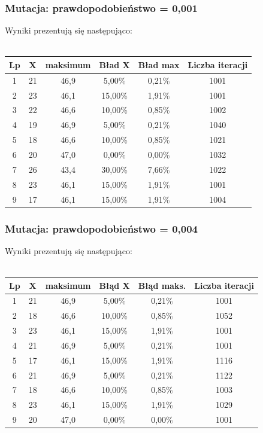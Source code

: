 \documentclass[a4paper,11pt]{article}
\begin{document}
				\subsubsection{Mutacja: prawdopodobieństwo = 0,001}
					Wyniki prezentują się następująco:\\~\\
					\begin{tabular}{|c|c|c|c|c|c|}
						\hline 
						Lp & X & maksimum & Bład X & Bład max & Liczba iteracji\\\hline
						1 & 21 & 46,9 & 5,00\% &0,21\%  &1001\\\hline
						2 & 23 & 46,1 & 15,00\% & 1,91\% &1001 \\\hline
						3 & 22 & 46,6 & 10,00\% &0,85\% &1002 \\\hline
						4 & 19 & 46,9 & 5,00\% & 0,21\%&1040 \\\hline
						5 & 18 & 46,6 & 10,00\% & 0,85\%&1021 \\\hline
						6 & 20 & 47,0 & 0,00\% & 0,00\%& 1032 \\\hline
						7 & 26 & 43,4 & 30,00\% & 7,66\%& 1022 \\\hline
						8 & 23 & 46,1 & 15,00\% & 1,91\%& 1001 \\\hline
						9 & 17 & 46,1&15,00\%  & 1,91\%& 1004 \\\hline
					\end{tabular} 
				\subsubsection{Mutacja: prawdopodobieństwo = 0,004}
					Wyniki prezentują się następująco:\\~\\
					\begin{tabular}{|c|c|c|c|c|c|}
						\hline 
						Lp & X & maksimum & Błąd X & Błąd maks. & Liczba iteracji\\
						\hline
						1 & 21 & 46,9 & 5,00\%  & 0,21\%  &1001\\\hline
						2 & 18 & 46,6 & 10,00\% & 0,85\% & 1052\\\hline
						3 & 23 & 46,1 & 15,00\% & 1,91\% &1001\\\hline
						4 & 21 & 46,9 & 5,00\%  & 0,21\% &1001\\\hline
						5 & 17 & 46,1 &  15,00\%& 1,91\% &1116\\\hline
						6 & 21  & 46,9 & 5,00\% & 0,21\% &1122\\\hline
						7 & 18 & 46,6 & 10,00\% & 0,85\% &1003\\\hline
						8 & 23 & 46,1 & 15,00\% & 1,91\% &1029\\\hline
						9 & 20 & 47,0 & 0,00\% & 0,00\% &1001\\\hline
					\end{tabular} 
\end{document}
